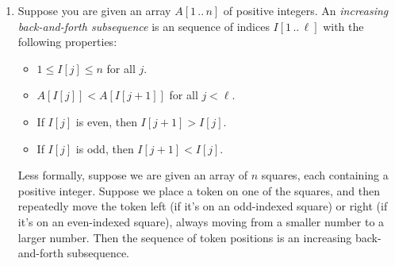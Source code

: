 \begin{enumerate}[label=\arabic*.,ref=\thechapter.\arabic*,leftmargin=*,align=left,widest*=99,itemsep=1.5ex plus 0.5ex]
\begin{enumerate}
\begin{itemize}
\end{itemize}
\item Describe and analyze an efficient algorithm to find the number of different ways that a given string can be decomposed into palindromes.
For example:
\begin{itemize}
\item Given the string , your algorithm should return $1$.
\item Given the string , your algorithm should return $70$.
\item Given a string of $n$ identical symbols, your algorithm should return $2^{n-1}$.
\end{itemize}
\item {} A \textbf{\textit{metapalindrome}} is a decomposition of a string into a sequence of palindromes, such that the sequence of palindrome lengths is itself a palindrome.
For example:
\[
\mbox{\Str{BOB} • \Str{S} • \Str{MAM} • \Str{ASEESA} • \Str{UKU} • \Str{L} • \Str{ELE}}
\]
is a metapalindrome for the string , whose length sequence is the palindrome $(3,1,3,6,3,1,3)$.
Describe and analyze an efficient algorithm to find the length of the shortest metapalindrome for a given string.
For example, given the input string , your algorithm should return 11.
\end{enumerate}

\item Suppose you are given an array $A[1\,..\,n]$ of positive integers.
An \textit{increasing back-and-forth subsequence} is an sequence of indices $I[1\,..\,\ell]$ with the following properties:
\begin{itemize}
\item $1 \le I[j] \le n$ for all $j$.
\item $A[I[j]] < A[I[j+1]]$ for all $j < \ell$.
\item If $I[j]$ is even, then $I[j+1] > I[j]$.
\item If $I[j]$ is odd, then $I[j+1] < I[j]$.
\end{itemize}
Less formally, suppose we are given an array of $n$ squares, each containing a positive integer.
Suppose we place a token on one of the squares, and then repeatedly move the token left (if it’s on an odd-indexed square) or right (if it’s on an even-indexed square), always moving from a smaller number to a larger number.
Then the sequence of token positions is an increasing back-and-forth subsequence.


\end{enumerate}
